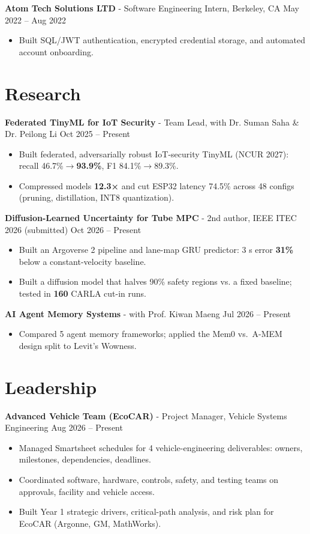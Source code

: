 \documentclass[11pt,a4paper]{article}
\newcommand{\blockspace}{\vspace{0.12em}}
\newenvironment{details}{\begin{itemize}[leftmargin=1.4em, label=\textbullet, topsep=0pt, itemsep=0pt, parsep=0pt, partopsep=0pt]}{\end{itemize}}
\begin{document}
\noindent\textbf{Atom Tech Solutions LTD} - Software Engineering Intern, Berkeley, CA \hfill May 2022 -- Aug 2022
\begin{details}
\item Built SQL/JWT authentication, encrypted credential storage, and automated account onboarding.
\end{details}

\section{Research}
\noindent\textbf{Federated TinyML for IoT Security} - Team Lead, with Dr. Suman Saha \& Dr. Peilong Li \hfill Oct 2025 -- Present
\begin{details}
\item Built federated, adversarially robust IoT-security TinyML (NCUR 2027): recall 46.7\%$\to$\textbf{93.9\%}, F1 84.1\%$\to$89.3\%.
\item Compressed models \textbf{12.3×} and cut ESP32 latency 74.5\% across 48 configs (pruning, distillation, INT8 quantization).
\end{details}
\blockspace

\noindent\textbf{Diffusion-Learned Uncertainty for Tube MPC} - 2nd author, IEEE ITEC 2026 (submitted) \hfill Oct 2026 -- Present
\begin{details}
\item Built an Argoverse 2 pipeline and lane-map GRU predictor: 3 s error \textbf{31\%} below a constant-velocity baseline.
\item Built a diffusion model that halves 90\% safety regions vs. a fixed baseline; tested in \textbf{160} CARLA cut-in runs.
\end{details}
\blockspace

\noindent\textbf{AI Agent Memory Systems} - with Prof. Kiwan Maeng \hfill Jul 2026 -- Present
\begin{details}
\item Compared 5 agent memory frameworks; applied the Mem0 vs.\ A-MEM design split to Levit's Wowness.
\end{details}

\section{Leadership}
\noindent\textbf{Advanced Vehicle Team (EcoCAR)} - Project Manager, Vehicle Systems Engineering \hfill Aug 2026 -- Present
\begin{details}
\item Managed Smartsheet schedules for 4 vehicle-engineering deliverables: owners, milestones, dependencies, deadlines.
\item Coordinated software, hardware, controls, safety, and testing teams on approvals, facility and vehicle access.
\item Built Year 1 strategic drivers, critical-path analysis, and risk plan for EcoCAR (Argonne, GM, MathWorks).
\end{details}
\blockspace
\end{document}
